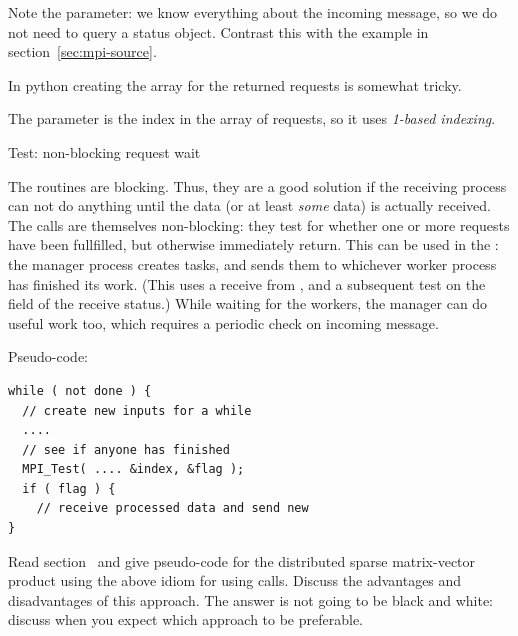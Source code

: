 Note the  parameter: we know everything
about the incoming message, so we do not need to query a status object.
Contrast this with the example in section~\ref{sec:mpi-source}.

\begin{pythonnote}
  In python creating the array for the returned requests is somewhat
  tricky.
\end{pythonnote}

\begin{fortrannote}
  The  parameter is the index in the array of requests,
  so it uses \emph{1-based indexing}.
\end{fortrannote}

 {Test: non-blocking request wait}
\label{sec:mpi-test}

The  routines are blocking. Thus, they are a good solution if 
the receiving process can not do anything until the data 
(or at least \emph{some} data) is actually received.
The  calls are themselves non-blocking: they
test for whether one or more requests have been
fullfilled, but otherwise immediately return.
This can be used in the
: the manager process creates tasks, and
sends them to whichever worker process has finished its work.
(This uses a receive from , and a
subsequent test on the  field of the receive status.)
While waiting for the workers, the manager can do useful work too,
which requires a periodic check on incoming message.

Pseudo-code:
\begin{lstlisting}
while ( not done ) {
  // create new inputs for a while
  ....
  // see if anyone has finished
  MPI_Test( .... &index, &flag );
  if ( flag ) {
    // receive processed data and send new
}
\end{lstlisting}


\begin{exercise}
  Read section~ and give pseudo-code for the
    distributed sparse matrix-vector product using the above idiom for
    using  calls. Discuss the advantages and
    disadvantages of this approach. The answer is not going to be
    black and white: discuss when you expect which approach to be
    preferable.
\end{exercise}

